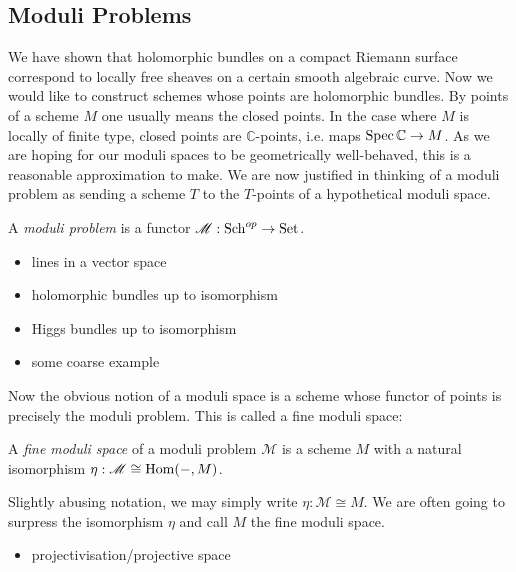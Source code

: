 \documentclass[12pt]{ociamthesis}  %
\begin{document}
\missingsection

\subsection{Moduli Problems}

We have shown that holomorphic bundles on a compact Riemann surface
correspond to locally free sheaves on a certain smooth algebraic
curve. Now we would like to construct schemes whose points are
holomorphic bundles. By points of a scheme $M$ one usually means the
closed points. In the case where $M$ is locally of finite type,
closed points are $\mathbb{C}$-points, i.e. maps
$\operatorname{Spec}\mathbb{C}\to M$. \cite[Corollary 3.36]{gortz2010} As we
are hoping for our moduli spaces to be geometrically well-behaved,
this is a reasonable approximation to make. We are now justified in
thinking of a moduli problem as sending a scheme $T$ to the
$T$-points of a hypothetical moduli space.

\begin{definition}
  A \emph{moduli problem} is a functor $\mathscr M:\operatorname{Sch}^{op}\to\operatorname{Set}$.
\end{definition}

\begin{example}
  \missingexample
  \begin{itemize}
    \item lines in a vector space
    \item holomorphic bundles up to isomorphism
    \item Higgs bundles up to isomorphism
    \item some coarse example
  \end{itemize}
\end{example}

Now the obvious notion of a moduli space is a scheme whose functor
of points is precisely the moduli problem. This is called a fine
moduli space:

\begin{definition}
  A \emph{fine moduli space} of a moduli problem $\mathscr M$
  is a scheme $M$ with a natural isomorphism
  $\eta : \mathscr M \cong \operatorname{Hom}(-,M)$.
\end{definition}

Slightly abusing notation, we may simply write
$\eta : \mathscr M \cong M$. We are often going to surpress the
isomorphism $\eta$ and call $M$ the fine moduli space.

\begin{example}
  \begin{itemize}
    \item projectivisation/projective space
  \end{itemize}
\end{example}
\end{document}
